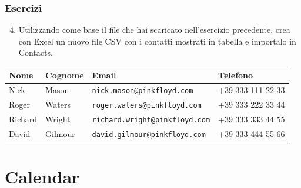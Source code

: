 \documentclass[handout]{beamer}
\begin{document}
\begin{frame}
\frametitle{Esercizi}
\begin{enumerate}\setcounter{enumi}{3}
  \item Utilizzando come base il file che hai scaricato nell'esercizio precedente, crea con Excel un nuovo file CSV con i contatti mostrati in tabella e importalo in Contacts.
\end{enumerate}
\begin{table}[]\def\arraystretch{1.5}\footnotesize
  \begin{tabular}{|l|l|l|l|}\hline
  \textbf{Nome} & \textbf{Cognome} & \textbf{Email}               & \textbf{Telefono} \\\hline
  Nick          & Mason            & \texttt{nick.mason@pinkfloyd.com}     & +39 333 111 22 33 \\\hline
  Roger         & Waters           & \texttt{roger.waters@pinkfloyd.com}   & +39 333 222 33 44 \\\hline
  Richard       & Wright           & \texttt{richard.wright@pinkfloyd.com} & +39 333 333 44 55 \\\hline
  David         & Gilmour          & \texttt{david.gilmour@pinkfloyd.com}  & +39 333 444 55 66 \\\hline
  \end{tabular}
\end{table}
\end{frame}


\section{Calendar}
\end{document}
